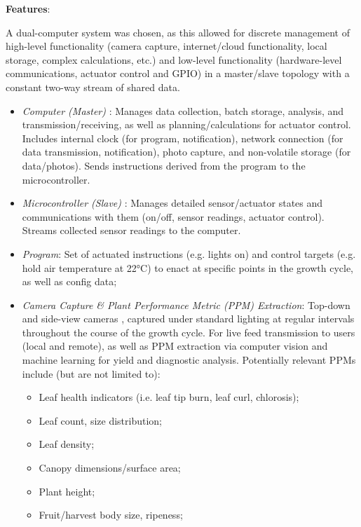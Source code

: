 \clearpage

\textbf{Features}:

A dual-computer system was chosen, as this allowed for discrete management of high-level functionality (camera capture, internet/cloud functionality, local storage, complex calculations, etc.) and low-level functionality (hardware-level communications, actuator control and GPIO) in a master/slave topology with a constant two-way stream of shared data.

\begin{itemize}
    \item \textit{Computer (Master)} \cite{raspberrypi}: Manages data collection, batch storage, analysis, and transmission/receiving, as well as planning/calculations for actuator control. Includes internal clock (for program, notification), network connection (for data transmission, notification), photo capture, and non-volatile storage (for data/photos). Sends instructions derived from the program to the microcontroller.
    \item \textit{Microcontroller (Slave)} \cite{arduino}: Manages detailed sensor/actuator states and communications with them (on/off, sensor readings, actuator control). Streams collected sensor readings to the computer.
    \item \textit{Program}: Set of actuated instructions (e.g. lights on) and control targets (e.g. hold air temperature at 22°C) to enact at specific points in the growth cycle, as well as config data;
    \item \textit{Camera Capture \& Plant Performance Metric (PPM) Extraction}: Top-down and side-view cameras \cite{camera}, captured under standard lighting at regular intervals throughout the course of the growth cycle. For live feed transmission to users (local and remote), as well as PPM extraction via computer vision and machine learning for yield and diagnostic analysis. Potentially relevant PPMs include (but are not limited to):
    \begin{itemize}
        \item Leaf health indicators (i.e. leaf tip burn, leaf curl, chlorosis);
        \item Leaf count, size distribution;
        \item Leaf density;
        \item Canopy dimensions/surface area;
        \item Plant height;
        \item Fruit/harvest body size, ripeness;
    \end{itemize}

\end{itemize}
